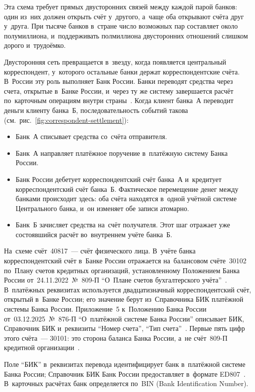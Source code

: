 Эта схема требует прямых двусторонних связей между каждой парой банков: один
из~них должен открыть счёт у~другого, а~чаще оба открывают счёта друг у~друга.
При тысяче банков в~стране число возможных пар составляет около полумиллиона,
и~поддерживать полмиллиона двусторонних отношений слишком дорого
и~трудоёмко.

Двусторонняя сеть превращается в~звезду, когда появляется центральный
корреспондент, у~которого остальные банки держат корреспондентские счёта.
В~России эту роль выполняет Банк России. Банки переводят средства через счета,
открытые в~Банке России, и~через ту же систему завершается расчёт по~карточным
операциям внутри страны~\cite{cbr-ps}. Когда клиент банка~А переводит деньги
клиенту банка~Б, последовательность событий такова
(см.~рис.~\ref{fig:correspondent-settlement}):

\begin{itemize}
  \item Банк~А списывает средства со~счёта отправителя.
  \item Банк~А направляет платёжное поручение в~платёжную систему Банка России.
  \item Банк России дебетует корреспондентский счёт банка~А и~кредитует
    корреспондентский счёт банка~Б. Фактическое перемещение денег между банками
    происходит здесь: оба счёта находятся в~одной учётной системе Центрального
    банка, и~он изменяет обе записи атомарно.
  \item Банк~Б зачисляет средства на~счёт получателя. Этот шаг отражает уже
    состоявшийся расчёт во~внутреннем учёте банка~Б.
\end{itemize}

На~схеме счёт~40817~--- счёт физического лица. В~учёте банка корреспондентский
счёт в~Банке России отражается на~балансовом счёте~30102 по~Плану счетов
кредитных организаций, установленному Положением Банка России
от~24.11.2022~№~809-П \enquote{О~Плане счетов бухгалтерского
учёта}~\cite{cbr-809p}. В~платёжных реквизитах используется двадцатизначный
корреспондентский счёт, открытый в~Банке России; его значение берут
из~Справочника БИК платёжной системы Банка России. Приложение~5
к~Положению Банка России от~03.12.2025~№~876-П \enquote{О~платёжной системе
Банка России} описывает БИК, Справочник БИК и~реквизиты \enquote{Номер счета},
\enquote{Тип счета}~\cite{cbr-876p,cbr-ps}. Первые пять цифр этого счёта~---
30101: это сторона баланса Банка России, а~не счёт~809-П кредитной
организации~\cite{cbr-3462u-comment}.

Поле \enquote{БИК} в~реквизитах перевода идентифицирует банк в~платёжной
системе Банка России; Справочник БИК Банк России предоставляет в~формате
ED807~\cite{cbr-ps}. В~карточных расчётах банк определяется по~BIN
(Bank Identification Number).


